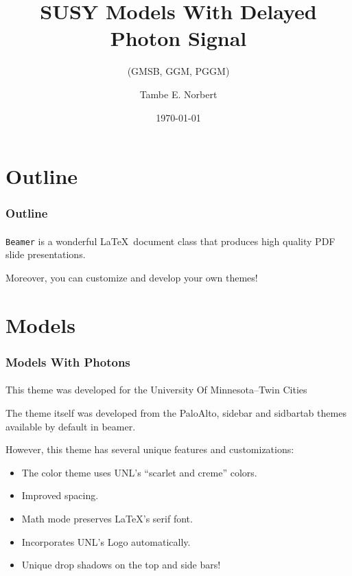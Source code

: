 \documentclass{beamer}
\title{SUSY Models With Delayed Photon Signal}
\subtitle{ (GMSB, GGM, PGGM)}
\author{Tambe E. Norbert} %
\institute{University Of Minnesota}
\date{\today}
\begin{document}
\begin{frame}
        \titlepage
        \begin{center}
    \href{mailto:norbe072@umn.edu}{}
        \end{center}
\end{frame}


\section{Outline}

\begin{frame}
    \frametitle{Outline}
    \tableofcontents
    \framesubtitle{}

    \texttt{Beamer} is a wonderful \LaTeX\ document class that produces
    high quality PDF slide presentations.
    
    Moreover, you can customize and develop your own themes!

\end{frame}

\section{Models}    

\begin{frame}
    \frametitle{Models With Photons}
    \framesubtitle{}

    This theme was developed for the University Of Minnesota--Twin Cities
    
    The theme itself was developed from the PaloAlto, sidebar and sidbartab
    themes available by default in beamer.
    
    However, this theme has several unique features and customizations:
    \begin{itemize}
      \item The color theme uses UNL's ``scarlet and creme'' colors.
      \item Improved spacing.
      \item Math mode preserves \LaTeX's serif font.
      \item Incorporates UNL's Logo automatically.
      \item Unique drop shadows on the top and side bars!
    \end{itemize}

\end{frame}
\end{document}
